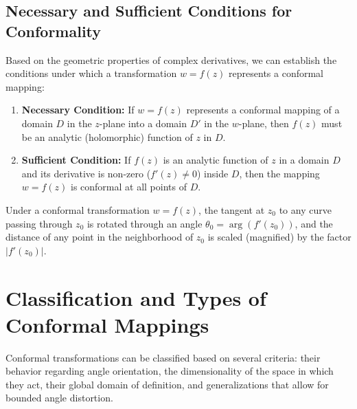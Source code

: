 \documentclass[12pt,a4paper]{article}
\begin{document}
\subsection{Necessary and Sufficient Conditions for Conformality}
Based on the geometric properties of complex derivatives, we can establish the conditions under which a transformation $w = f(z)$ represents a conformal mapping:
\begin{enumerate}
    \item \textbf{Necessary Condition:} If $w = f(z)$ represents a conformal mapping of a domain $D$ in the $z$-plane into a domain $D'$ in the $w$-plane, then $f(z)$ must be an analytic (holomorphic) function of $z$ in $D$.
    \item \textbf{Sufficient Condition:} If $f(z)$ is an analytic function of $z$ in a domain $D$ and its derivative is non-zero ($f'(z) \neq 0$) inside $D$, then the mapping $w = f(z)$ is conformal at all points of $D$.
\end{enumerate}
Under a conformal transformation $w = f(z)$, the tangent at $z_0$ to any curve passing through $z_0$ is rotated through an angle $\theta_0 = \arg(f'(z_0))$, and the distance of any point in the neighborhood of $z_0$ is scaled (magnified) by the factor $|f'(z_0)|$.

\section{Classification and Types of Conformal Mappings}
Conformal transformations can be classified based on several criteria: their behavior regarding angle orientation, the dimensionality of the space in which they act, their global domain of definition, and generalizations that allow for bounded angle distortion.
\end{document}
